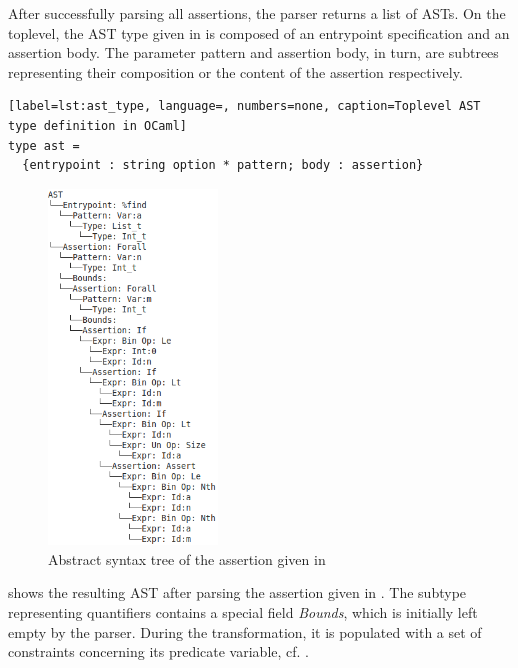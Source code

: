 After successfully parsing all assertions, the parser returns a list of ASTs. On the toplevel, the AST type given in  is composed of an entrypoint specification and an assertion body. The parameter pattern and assertion body, in turn, are  subtrees representing their composition or the content of the assertion respectively.
\begin{lstlisting}[label=lst:ast_type, language=, numbers=none, caption=Toplevel AST type definition in OCaml]
type ast =
  {entrypoint : string option * pattern; body : assertion}
\end{lstlisting}

\begin{figure}
\vspace{-30pt}
 \begin{center}
  \includegraphics[width=0.4\textwidth]{figures/3-offline/ast_example_find}
  \end{center}
  \caption{Abstract syntax tree of the assertion given in }
  \label{fig:ast_example}
  \vspace{-30pt}
\end{figure}

 shows the resulting AST after parsing the assertion given in . The subtype representing quantifiers contains a special field \textit{Bounds}, which is initially left empty by the parser. During the transformation, it is populated with a set of constraints concerning its predicate variable, cf. .

